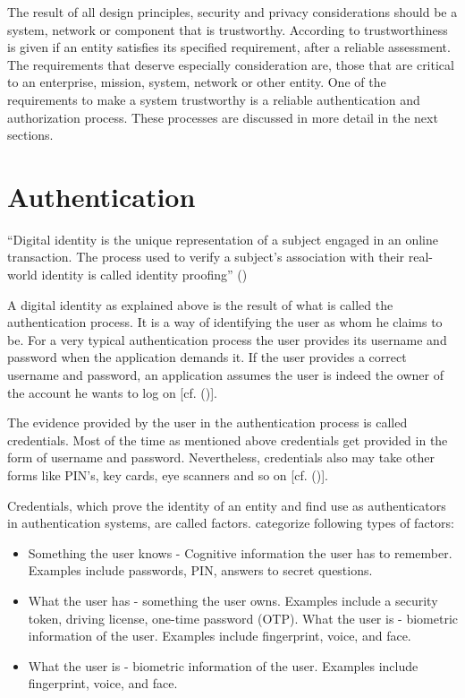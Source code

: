 The result of all design principles, security and privacy considerations should be a system, network or component that is trustworthy. According to \cite{Neumann:2018:PTC} trustworthiness is given if an entity satisfies its specified requirement, after a reliable assessment. The requirements that deserve especially consideration are, those that are critical to an enterprise, mission, system, network or other entity. One of the requirements to make a system trustworthy is a reliable authentication and authorization process. These processes are discussed in more detail in the next sections.
	

\section{Authentication}

“Digital identity is the unique representation of a subject engaged in an online transaction. The process used to verify a subject’s association with their real-world identity is called identity proofing” (\citet{NIST:2017:DIG})

A digital identity as explained above is the result of what is called the authentication process. It is a way of identifying the user as whom he claims to be. For a very typical authentication process the user provides its username and password when the application demands it. If the user provides a correct username and password, an application assumes the user is indeed the owner of the account he wants to log on [cf. (\citet{Boyed:2012:GSOA})]. 

The evidence provided by the user in the authentication process is called credentials. Most of the time as mentioned above credentials get provided in the form of username and password. Nevertheless, credentials also may take other forms like PIN’s, key cards, eye scanners and so on [cf. (\citet{Todorov:2007:MUI})]. 

Credentials, which prove the identity of an entity and find use as authenticators in authentication systems, are called factors. \citet{NIST:2017:DIG} categorize following types of factors:

\begin{itemize}  
\item Something the user knows - Cognitive information the user has to remember. Examples include passwords, PIN, answers to secret questions.
\item What the user has - something the user owns. Examples include a security token, driving license, one-time password (OTP). 
What the user is - biometric information of the user. Examples include fingerprint, voice, and face.  
\item What the user is - biometric information of the user. Examples include fingerprint, voice, and face. 
\end{itemize}

